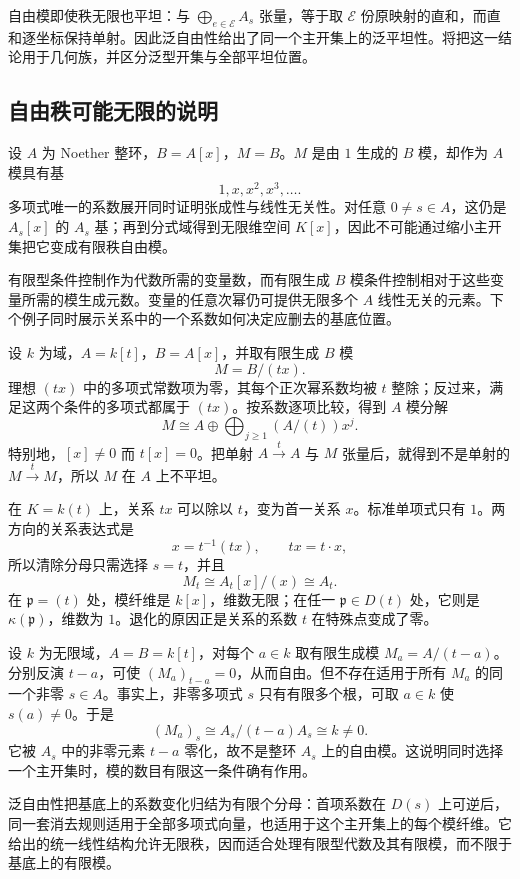 自由模即使秩无限也平坦：与 \(\bigoplus_{e\in\mathcal E}A_s\) 张量，等于取 \(\mathcal E\) 份原映射的直和，而直和逐坐标保持单射。因此泛自由性给出了同一个主开集上的泛平坦性。将把这一结论用于几何族，并区分泛型开集与全部平坦位置。

\subsection{自由秩可能无限的说明}
\label{g5:subsec:0603:05}

\begin{example}\label{g5:exm:generic-free-infinite-rank}
	设 \(A\) 为 Noether 整环，\(B=A[x]\)，\(M=B\)。\(M\) 是由 \(1\) 生成的 \(B\) 模，却作为 \(A\) 模具有基
	\[
		1,x,x^2,x^3,\ldots.
	\]
	多项式唯一的系数展开同时证明张成性与线性无关性。对任意 \(0\ne s\in A\)，这仍是 \(A_s[x]\) 的 \(A_s\) 基；再到分式域得到无限维空间 \(K[x]\)，因此不可能通过缩小主开集把它变成有限秩自由模。
\end{example}

有限型条件控制作为代数所需的变量数，而有限生成 \(B\) 模条件控制相对于这些变量所需的模生成元数。变量的任意次幂仍可提供无限多个 \(A\) 线性无关的元素。下个例子同时展示关系中的一个系数如何决定应删去的基底位置。

\begin{example}\label{g5:exm:generic-free-tx}
	设 \(k\) 为域，\(A=k[t]\)，\(B=A[x]\)，并取有限生成 \(B\) 模
	\[
		M=B/(tx).
	\]
	理想 \((tx)\) 中的多项式常数项为零，其每个正次幂系数均被 \(t\) 整除；反过来，满足这两个条件的多项式都属于 \((tx)\)。按系数逐项比较，得到 \(A\) 模分解
	\[
		M\cong A\oplus\bigoplus_{j\geq1}(A/(t))x^j.
	\]
	特别地，\([x]\ne0\) 而 \(t[x]=0\)。把单射 \(A\xrightarrow{\,t\,}A\) 与 \(M\) 张量后，就得到不是单射的 \(M\xrightarrow{\,t\,}M\)，所以 \(M\) 在 \(A\) 上不平坦。

	在 \(K=k(t)\) 上，关系 \(tx\) 可以除以 \(t\)，变为首一关系 \(x\)。标准单项式只有 \(1\)。两方向的关系表达式是
	\[
		x=t^{-1}(tx),\qquad tx=t\cdot x,
	\]
	所以清除分母只需选择 \(s=t\)，并且
	\[
		M_t\cong A_t[x]/(x)\cong A_t.
	\]
	在 \(\mathfrak p=(t)\) 处，模纤维是 \(k[x]\)，维数无限；在任一 \(\mathfrak p\in D(t)\) 处，它则是 \(\kappa(\mathfrak p)\)，维数为 \(1\)。退化的原因正是关系的系数 \(t\) 在特殊点变成了零。
\end{example}

\begin{example}\label{g5:exm:generic-free-no-common-open}
	设 \(k\) 为无限域，\(A=B=k[t]\)，对每个 \(a\in k\) 取有限生成模 \(M_a=A/(t-a)\)。分别反演 \(t-a\)，可使 \((M_a)_{t-a}=0\)，从而自由。但不存在适用于所有 \(M_a\) 的同一个非零 \(s\in A\)。事实上，非零多项式 \(s\) 只有有限多个根，可取 \(a\in k\) 使 \(s(a)\ne0\)。于是
	\[
		(M_a)_s\cong A_s/(t-a)A_s\cong k\ne0.
	\]
	它被 \(A_s\) 中的非零元素 \(t-a\) 零化，故不是整环 \(A_s\) 上的自由模。这说明同时选择一个主开集时，模的数目有限这一条件确有作用。
\end{example}

泛自由性把基底上的系数变化归结为有限个分母：首项系数在 \(D(s)\) 上可逆后，同一套消去规则适用于全部多项式向量，也适用于这个主开集上的每个模纤维。它给出的统一线性结构允许无限秩，因而适合处理有限型代数及其有限模，而不限于基底上的有限模。
